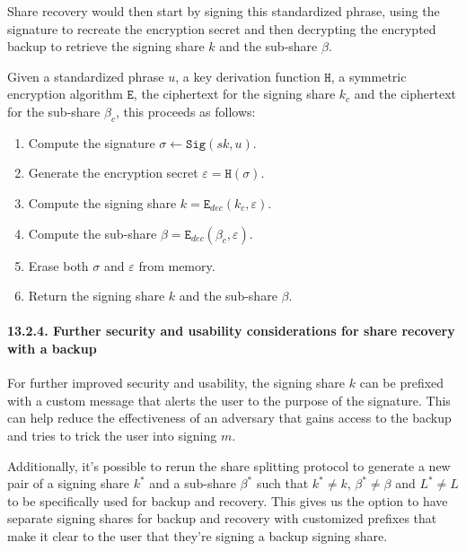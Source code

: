 \documentclass[
]{article}
\providecommand{\tightlist}{%
  \setlength{\itemsep}{0pt}\setlength{\parskip}{0pt}}
\begin{document}
Share recovery would then start by signing this standardized phrase,
using the signature to recreate the encryption secret and then
decrypting the encrypted backup to retrieve the signing share \(k\) and
the sub-share \(\beta\).

Given a standardized phrase \(u\), a key derivation function
\(\mathtt{H}\), a symmetric encryption algorithm \(\mathtt{E}\), the
ciphertext for the signing share \(k_c\) and the ciphertext for the
sub-share \(\beta _c\), this proceeds as follows:

\begin{enumerate}
\def\labelenumi{\arabic{enumi}.}
\tightlist
\item
  Compute the signature \(\sigma \leftarrow \mathtt{Sig}(sk, u)\).
\item
  Generate the encryption secret \(\varepsilon = \mathtt{H}(\sigma)\).
\item
  Compute the signing share \(k = \mathtt{E} _{dec}(k_c, \varepsilon)\).
\item
  Compute the sub-share
  \(\beta = \mathtt{E} _{dec}(\beta _c, \varepsilon)\).
\item
  Erase both \(\sigma\) and \(\varepsilon\) from memory.
\item
  Return the signing share \(k\) and the sub-share \(\beta\).
\end{enumerate}

\hypertarget{share-recovery-backup-enhancements}{%
\paragraph{13.2.4. Further security and usability considerations for
share recovery with a backup}\label{share-recovery-backup-enhancements}}

For further improved security and usability, the signing share \(k\) can
be prefixed with a custom message that alerts the user to the purpose of
the signature. This can help reduce the effectiveness of an adversary
that gains access to the backup and tries to trick the user into signing
\(m\).

Additionally, it's possible to rerun the share splitting protocol to
generate a new pair of a signing share \(k^ \ast\) and a sub-share
\(\beta ^ \ast\) such that \(k^ \ast \neq k\),
\(\beta ^ \ast \neq \beta\) and \(L^ \ast \neq L\) to be specifically
used for backup and recovery. This gives us the option to have separate
signing shares for backup and recovery with customized prefixes that
make it clear to the user that they're signing a backup signing share.
\end{document}
